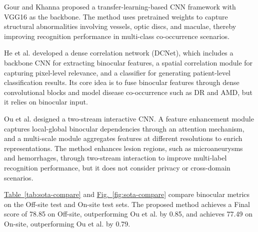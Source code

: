 Gour and Khanna \cite{_Ref214903299} proposed a transfer-learning-based CNN framework with VGG16 as the backbone.  The method uses pretrained weights to capture structural abnormalities involving vessels, optic discs, and maculae, thereby improving recognition performance in multi-class co-occurrence scenarios.

He et al. \cite{_Ref213950338} developed a dense correlation network (DCNet), which includes a backbone CNN for extracting binocular features, a spatial correlation module for capturing pixel-level relevance, and a classifier for generating patient-level classification results. Its core idea is to fuse binocular features through dense convolutional blocks and model disease co-occurrence such as DR and AMD, but it relies on binocular input.

Ou et al. \cite{_Ref214903327} designed a two-stream interactive CNN. A feature enhancement module captures local-global binocular dependencies through an attention mechanism, and a multi-scale module aggregates features at different resolutions to enrich representations. The method enhances lesion regions, such as microaneurysms and hemorrhages, through two-stream interaction to improve multi-label recognition performance, but it does not consider privacy or cross-domain scenarios.

\hyperref[tab:sota-compare]{Table~\ref*{tab:sota-compare}} and \hyperref[fig:sota-compare]{Fig.~\ref*{fig:sota-compare}} compare binocular metrics on the Off-site test and On-site test sets.  The proposed method achieves a Final score of 78.85 on Off-site, outperforming Ou et al. \cite{_Ref214903327} by 0.85, and achieves 77.49 on On-site, outperforming Ou et al. \cite{_Ref214903327} by 0.79. 

